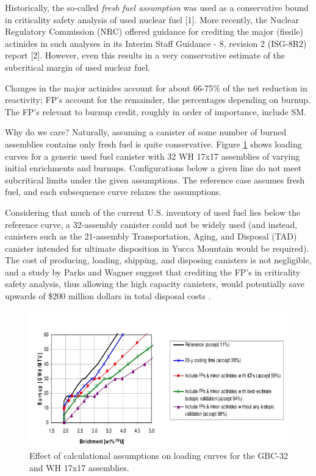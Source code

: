 Historically, the so-called \textit{fresh fuel assumption} was used as a conservative bound
in criticality safety analysis of used nuclear fuel [1]. More recently, the Nuclear
Regulatory Commission (NRC) offered guidance for crediting the major (fissile) actinides
in such analyses in its Interim Staff Guidance - 8, revision 2 (ISG-8R2) report [2]. However,
even this results in a very conservative estimate of the subcritical margin of used
nuclear fuel.

Changes in the major actinides account for about 66-75\% of the net reduction
in reactivity; FP's account for the remainder, the percentages depending on burnup.
The FP's relevant to burnup credit, roughly in order of importance, include SM.
 
Why do we care?  Naturally, assuming a canister of some number of burned assemblies 
contains only fresh fuel is quite conservative.  Figure \ref{fig:loading_curve} shows 
loading curves for a generic used fuel canister with 32 WH 17x17 assemblies of varying 
initial enrichments and burnups.  Configurations below a given line do not meet subcritical 
limits under the given assumptions.  The reference case assumes fresh fuel, and each 
subsequence curve relaxes the assumptions.  

Considering that much of the current U.S. inventory of used fuel lies below the reference 
curve, a 32-assembly canister could not be widely used (and instead, canisters such as
the 21-assembly Transportation, Aging, and Disposal (TAD) canister intended for ultimate
disposition in Yucca Mountain would be required).  The cost of producing, loading, shipping, 
and disposing canisters is not negligible, and a study by Parks and Wagner suggest that
crediting the FP's in criticality safety analysis, thus allowing the high capacity
canisters, would potentially save upwards of \$200 million dollars in total disposal
costs \cite{parks2004csp}. 

\begin{figure}[ht] 
    \centering
    \includegraphics[keepaspectratio, width = 5.0 in]{images/loading_curve}
    \caption{Effect of calculational assumptions on loading curves for the GBC-32 and WH 17x17 assemblies.}
    \label{fig:loading_curve}
\end{figure}

